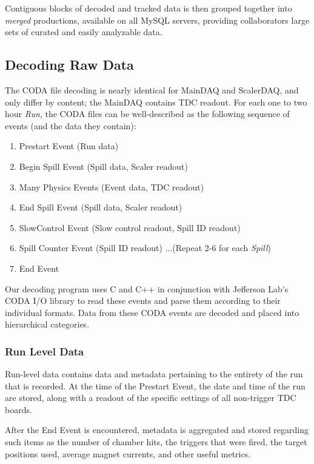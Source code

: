 Contiguous blocks of decoded and tracked data is then grouped together into \emph{merged} productions, available on all MySQL servers, providing collaborators large sets of curated and easily analyzable data.

\subsection{Decoding Raw Data}

The CODA file decoding is nearly identical for MainDAQ and ScalerDAQ, and only differ by content; the MainDAQ contains TDC readout. For each one to two hour \emph{Run}, the CODA files can be well-described as the following sequence of events (and the data they contain):
\begin{enumerate}
	\item Prestart Event (Run data)
	\item Begin Spill Event (Spill data, Scaler readout)
	\item Many Physics Events (Event data, TDC readout)
	\item End Spill Event (Spill data, Scaler readout)
	\item SlowControl Event (Slow control readout, Spill ID readout)
	\item Spill Counter Event (Spill ID readout) \newline ...(Repeat 2-6 for each \emph{Spill})
	\item End Event
\end{enumerate}

Our decoding program uses C and C++ in conjunction with Jefferson Lab's CODA I/O library to read these events and parse them according to their individual formats. Data from these CODA events are decoded and placed into hierarchical categories.

\subsubsection{Run Level Data}
Run-level data contains data and metadata pertaining to the entirety of the run that is recorded. At the time of the Prestart Event, the date and time of the run are stored, along with a readout of the specific settings of all non-trigger TDC boards.

After the End Event is encountered, metadata is aggregated and stored regarding such items as the number of chamber hits, the triggers that were fired, the target positions used, average magnet currents, and other useful metrics. 

